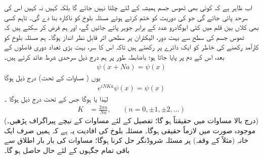 اب ظاہر ہے کہ کوئی بھی   ٹھوس جسم ہمیشہ کے لئے چلتا نہیں جائے گا بلکہ کہیں نہ کہیں اس کی سرحد پائی جائے گی جو  کی دوریت کو ختم کرتے ہوئے مسئلہ بلوخ کو ناکارہ بنا دے گی۔ تاہم کسی بھی کلاں بین   قلم میں کئی ایوگادرو عدد کے برابر جوہر پائے جائیں گے، اور ہم فرض کر سکتے ہیں کہ ٹھوس جسم کی سطح سے بہت دور، الیکٹران پر سطحی اثر قابل نظر انداز ہوگا۔ ہم مسئلہ بلوخ کو کارآمد رکھنے کی خاطر   کو ایک دائرے پر رکھتے ہیں تاکہ اس کا سر،   بہت بڑی تعداد  دوری فاصلوں  کے بعد،  اس کے دم  پر پایا جاتا ہو؛  باضابطہ طور پر ہم درج ذیل سرحدی شرط  عائد  کرتے ہیں۔   
\begin{align}
	\psi(x+Na) = \psi(x)
\end{align}
یوں ( مساوات  کے تحت)  درج ذیل ہوگا
\begin{align*}
	e^{iNKa}\psi(x) = \psi(x)
\end{align*}
لہٰذا  یا  ہوگا جس کے تحت درج ذیل ہوگا ۔
\begin{align}\label{مساوات_متماثل_مستقلات_قیمتیں}
	K &= \frac{2\pi n}{Na}, &&(n = 0, \pm1, \pm2, \dotsc)
\end{align}
 (درج  بالا  مساوات میں حقیقتاً   ہو گا؛ تفصیل کے لئے مساوات  کے نیچے پیراگراف پڑھیں۔) موجودہ صورت میں    لازماً حقیقی ہوگا۔   مسئلہ بلوخ کی افادیت یہ ہے کہ ہمیں صرف ایک خانہ  (مثلاً  کے وقفہ) پر مسئلہ شروڈنگر حل کرنا ہوگا؛  مساوات  کی بار بار اطلاق سے باقی تمام  جگہوں  کے لئے  حال حاصل ہو گا۔

